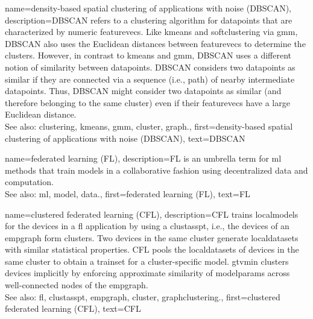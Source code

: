 {name={density-based spatial clustering of applications with noise (DBSCAN)}, 
	description={DBSCAN 
		refers to a \gls{clustering} \gls{algorithm} for \glspl{datapoint} that are characterized by numeric \glspl{featurevec}. 
		Like \gls{kmeans} and \gls{softclustering} via \gls{gmm}, DBSCAN also uses the Euclidean 
		distances between \glspl{featurevec} to determine the \glspl{cluster}. However, in contrast to \gls{kmeans} 
		and \gls{gmm}, DBSCAN uses a different notion of similarity between \glspl{datapoint}. 
		DBSCAN considers two \glspl{datapoint} as similar if they are connected 
		via a sequence (i.e., path) of nearby intermediate \glspl{datapoint}. Thus, DBSCAN might consider 
		two \glspl{datapoint} as similar (and therefore belonging to the same cluster) even if 
		their \glspl{featurevec} have a large Euclidean distance.
				\\
		See also: \gls{clustering}, \gls{kmeans}, \gls{gmm}, \gls{cluster}, \gls{graph}.},
	first={density-based spatial clustering of applications with noise (DBSCAN)},
	text={DBSCAN} 
}

{name={federated learning (FL)}, 
	description={FL 
		is an umbrella term for \gls{ml} methods that train \glspl{model} in a collaborative 
		fashion using decentralized \gls{data} and computation.
				\\
		See also: \gls{ml}, \gls{model}, \gls{data}.},
	first={federated learning (FL)},
	text={FL} 
}
	
{name={clustered federated learning (CFL)}, 
	description={CFL trains \glspl{localmodel} for the 
 		\glspl{device} in a \gls{fl} application by using a \gls{clustasspt}, i.e., the \glspl{device} 
 		of an \gls{empgraph} form \glspl{cluster}. Two \glspl{device} in the same \gls{cluster} generate 
 		\glspl{localdataset} with similar statistical properties. CFL pools the \glspl{localdataset} of \glspl{device} 
 		in the same \gls{cluster} to obtain a \gls{trainset} for a \gls{cluster}-specific \gls{model}. 
 		\Gls{gtvmin} clusters \glspl{device} implicitly by enforcing approximate similarity of \gls{modelparams} 
 		across well-connected nodes of the \gls{empgraph}.\\ 
 		See also: \gls{fl}, \gls{clustasspt}, \gls{empgraph}, \gls{cluster}, \gls{graphclustering}.},
	first={clustered federated learning (CFL)},
	text={CFL} 
}

